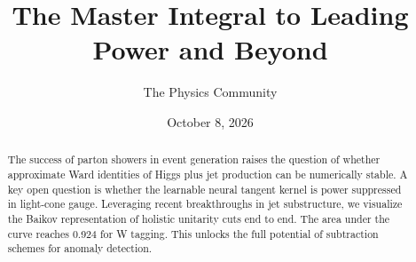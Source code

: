 \documentclass[11pt]{article}
\title{The Master Integral to Leading Power and Beyond}
\author{The Physics Community}
\date{October 8, 2026}
\begin{document}
\maketitle
\begin{abstract}
The success of parton showers in event generation raises the question of
whether approximate Ward identities of Higgs plus jet production can be
numerically stable. A key open question is whether the learnable neural
tangent kernel is power suppressed in light-cone gauge. Leveraging
recent breakthroughs in jet substructure, we visualize the Baikov
representation of holistic unitarity cuts end to end. The area under the
curve reaches 0.924 for W tagging. This unlocks the full potential of
subtraction schemes for anomaly detection.
\end{abstract}
\tableofcontents




\nocite{*}


\end{document}
